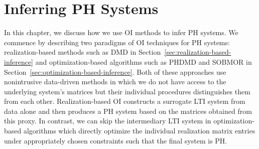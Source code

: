 \chapter[Inferring \texorpdfstring{\ac{PH} Systems}{PH}]{%
    Inferring \texorpdfstring{\acl{PH}}{Port-Hamiltonian} Systems
}\label{chap:inferring-models}

In this chapter, we discuss how we use \ac{OI} methods to infer \ac{PH} systems.
We commence by describing two paradigms of \ac{OI} techniques for \ac{PH} systems: realization-based methods such as \ac{DMD} in Section~\ref{sec:realization-based-inference} and optimization-based algorithms such as \ac{PHDMD} and \ac{SOBMOR} in Section~\ref{sec:optimization-based-inference}.
Both of these approaches use nonintrusive data-driven methods in which we do not have access to the underlying system's matrices but their individual procedures distinguishes them from each other.
Realization-based \ac{OI} constructs a surrogate \ac{LTI} system from data alone and then produces a \ac{PH} system based on the matrices obtained from this proxy.
In contrast, we can skip the intermediary \ac{LTI} system in optimization-based algorithms which directly optimize the individual realization matrix entries under appropriately chosen constraints such that the final system is \ac{PH}.



